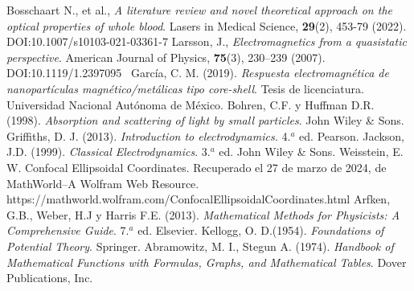\documentclass[paper=letter,8.5pt]{article}
\begin{document}
\begin{thebibliography}{99}
 Bosschaart N., et al., \textit{A literature review and novel theoretical approach on the optical properties of whole blood}. Lasers in Medical Science, \textbf{29}(2), 453-79 (2022). DOI:10.1007/s10103-021-03361-7
 Larsson, J., \textit{Electromagnetics from a quasistatic perspective}. American Journal of Physics, \textbf{75}(3), 230–239 (2007). DOI:10.1119/1.2397095 
 García, C. M. (2019). \textit{Respuesta electromagnética de nanopartículas magnético/metálicas tipo core-shell}. Tesis de licenciatura. Universidad Nacional Autónoma de México.
Bohren, C.F. y  Huffman D.R.  (1998). \textit{Absorption and scattering of light by small particles}. John Wiley \& Sons.
Griffiths, D. J.  (2013). \textit{Introduction to electrodynamics.} 4.$^a$ ed. Pearson.
Jackson, J.D.  (1999). \textit{Classical Electrodynamics}. 3.$^a$ ed.  John Wiley \& Sons.
 Weisstein, E. W. Confocal Ellipsoidal Coordinates. Recuperado el 27 de marzo de 2024, de MathWorld--A Wolfram Web Resource. https://mathworld.wolfram.com/ConfocalEllipsoidalCoordinates.html
 Arfken, G.B., Weber, H.J y Harris F.E. (2013). \textit{Mathematical Methods for Physicists: A Comprehensive Guide}. 7.$^a$ ed. Elsevier.
 Kellogg, O. D.(1954). \textit{Foundations of Potential Theory}. Springer.
 Abramowitz, M. I., Stegun A. (1974). \textit{Handbook of Mathematical Functions with Formulas, Graphs, and
Mathematical Tables}. Dover Publications, Inc.
\end{thebibliography}

\end{document}
